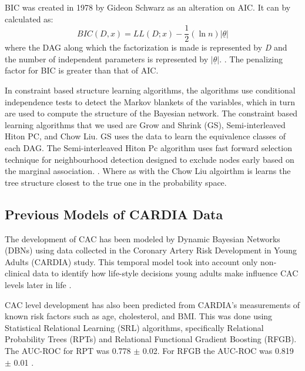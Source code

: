 BIC was created in 1978 by Gideon Schwarz \cite{Schwarz1978} as an alteration on AIC. It can by calculated as:
\begin{equation}
    BIC(D, x) = LL(D; x) - \frac{1}{2}(\ln n)|\underline{\theta}|
\end{equation}
where the DAG along which the factorization is made is represented by \textit{D} and the number of independent parameters is represented by \begin{math}|\underline{\theta}|\end{math}.   \cite{Vol2012}. The penalizing factor for BIC is greater than that of AIC.

In constraint based structure learning algorithms, the algorithms use conditional independence tests to detect the Markov blankets of the variables, which in turn are used to compute the structure of the Bayesian network. \cite{scutari2017package}  The constraint based learning algorithms that we used are Grow and Shrink (GS), Semi-interleaved Hiton PC, and Chow Liu.  GS uses the data to  learn the equivalence classes of each DAG.\cite{scutari2017package} The Semi-interleaved Hiton Pc algorithm uses fast forward selection technique for neighbourhood detection designed to exclude nodes early based on the marginal association. \cite{scutari2017package}.  Where as with the Chow Liu algoirthm is learns the tree structure closest to the true one in the probability space. \cite{scutari2017package}



\subsection{Previous Models of CARDIA Data}
The development of CAC has been modeled by Dynamic Bayesian Networks (DBNs) using data collected in the Coronary Artery Risk Development in Young Adults (CARDIA) study. This temporal model took into account only non-clinical data to identify how life-style decisions young adults make influence CAC levels later in life \cite{Yang}.

CAC level development has also been predicted from CARDIA's measurements of known risk factors such as age, cholesterol, and BMI. This was done using Statistical Relational Learning (SRL) algorithms, specifically Relational Probability Trees (RPTs) and Relational Functional Gradient Boosting (RFGB). The AUC-ROC for RPT was 0.778 $\pm$ 0.02. For RFGB the AUC-ROC was 0.819 $\pm$ 0.01 \cite{Natarajan2013}. 




